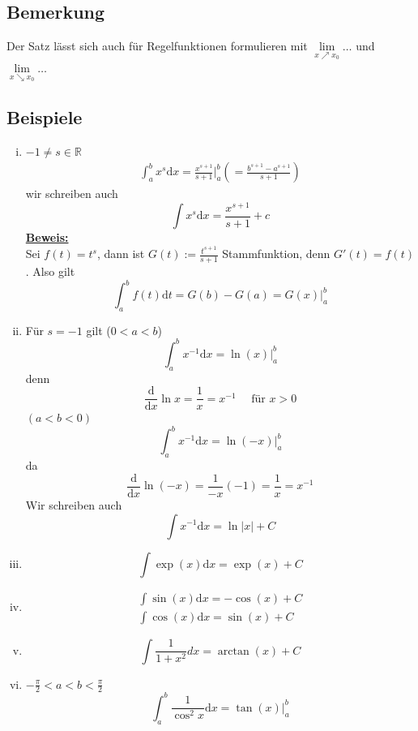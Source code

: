 \subsection{Bemerkung} %
\label{sub:bemerkung}
Der Satz lässt sich auch für Regelfunktionen formulieren mit $\lim\limits_{x \nearrow x_0} \ldots $ und $\lim\limits_{x \searrow x_0} \ldots $

\subsection{Beispiele} %
\label{sub:beispiele}
\begin{enumerate}[(i)]
	\item $-1 \not= s \in \mathds{R}$
	\begin{align*}
		\int_{a} ^{b} \! x^s  \mathrm{d}x = \frac{x^{s+1}}{s+1} \bigg|_a^b \left( = \frac{b^{s+1} - a^{s+1}}{s+1}  \right) 
	\end{align*}
	wir schreiben auch
	\[
		\int \! x^s  \mathrm{d}x = \frac{x^{s+1}}{s+1} + c  
	\]
	\underline{\textbf{Beweis:}} \\
	Sei $f(t)=t^s$, dann ist $G(t):= \frac{t^{s+1}}{s+1} $ Stammfunktion, denn $G'(t)= f(t)$. Also gilt 
	\[
		\int_{a} ^{b} \! f(t)  \mathrm{d}t = G(b)-G(a)= G(x)\Big|_a^b
	\]
	\item Für $s=-1$ gilt ($0<a<b$)
	\[
		\int_{a} ^{b} \! x^{-1}  \mathrm{d}x = \ln (x) \Big|_a^b
	\]
	denn
	\[
		\frac{ \mathrm{d}}{ \mathrm{d}x }  \ln x = \frac{1}{x} = x^{-1} \quad \text{ für } x>0 
	\]
	$(a<b<0)$
	\[
		\int_{a} ^{b} \! x ^{-1}  \mathrm{d}x  = \ln (-x)\Big|_a^b
	\]
	da
	\[
		\frac{ \mathrm{d}}{ \mathrm{d}x } \ln (-x) = \frac{1}{-x} (-1) = \frac{1}{x} = x ^{-1}  
	\]
	Wir schreiben auch 
	\[
		\int \! x ^{-1}  \mathrm{d}x = \ln |x| + C 
	\]
	\item 
	\[
		\int  \! \exp (x) \mathrm{d}x = \exp (x)  + C
	\]
	\item 
	\begin{gather*}
		\int  \! \sin (x)  \mathrm{d}x = - \cos (x) + C \\
		\int  \! \cos (x)  \mathrm{d}x =  \sin (x) + C
	\end{gather*}
	\item 
	\[
		\int  \! \frac{1}{1+x^2} dx = \arctan (x) + C  \tag{12.7}
	\]
	\item $- \frac{\pi}{2} < a <b < \frac{\pi}{2}$
	\[
		\int_{a}^{b} \! \frac{1}{\cos^2 x}  \mathrm{d}x =   \tan(x)\Big|_a^b \tag{12.5}
	\]
	
\end{enumerate}

